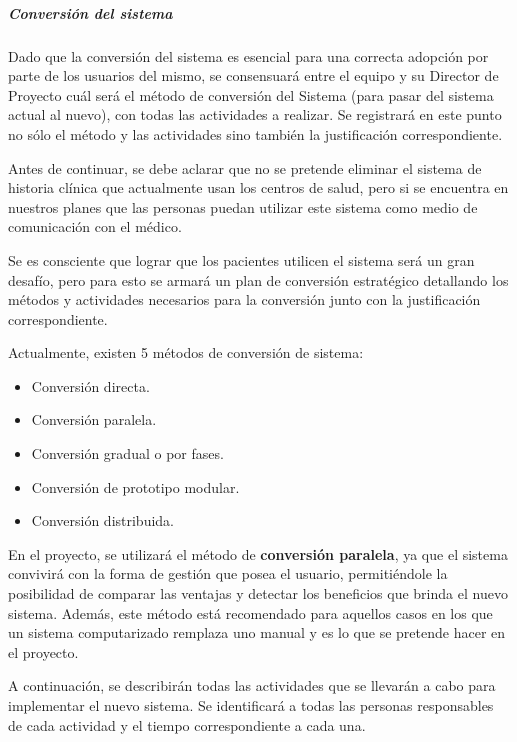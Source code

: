 \subparagraph{Conversión del sistema}

Dado que la conversión del sistema es esencial para una correcta adopción por parte de los usuarios del mismo, se consensuará entre el equipo y su Director de Proyecto cuál será el método de conversión del Sistema (para pasar del sistema actual al nuevo), con todas las actividades a realizar.
Se registrará en este punto no sólo el método y las actividades sino también la justificación correspondiente.

Antes de continuar, se debe aclarar que no se pretende eliminar el sistema de historia clínica que actualmente usan los centros de salud, pero si se encuentra en nuestros planes que las personas puedan utilizar este sistema como medio de comunicación con el médico.

Se es consciente que lograr que los pacientes utilicen el sistema será un gran desafío, pero para esto se armará un plan de conversión estratégico detallando los métodos y actividades necesarios para la conversión junto con la justificación correspondiente.

Actualmente, existen 5 métodos de conversión de sistema:
\begin{itemize}
    \item Conversión directa.
    \item Conversión paralela.
    \item Conversión gradual o por fases.
    \item Conversión de prototipo modular.
    \item Conversión distribuida.
\end{itemize}

En el proyecto, se utilizará el método de \textbf{conversión paralela}, ya que el sistema convivirá con la forma de gestión que posea el usuario, permitiéndole la posibilidad  de comparar las ventajas y detectar los beneficios que brinda el nuevo sistema.
Además, este método está recomendado para aquellos casos en los que un sistema computarizado remplaza uno manual y es lo que se pretende hacer en el proyecto.

A continuación, se describirán todas las actividades que se llevarán a cabo para implementar el nuevo sistema.
Se identificará a todas las personas responsables de cada actividad y el tiempo correspondiente a cada una.


